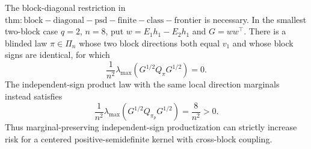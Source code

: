 The block-diagonal restriction in \(\mathrm{thm:block-diagonal-psd-finite-class-frontier}\) is necessary.  In the smallest two-block case \(q=2\), \(n=8\), put \(w=E_1h_1-E_2h_1\) and \(G=ww^\top\).  There is a blinded law \(\pi\in\Pi_n\) whose two block directions both equal \(v_1\) and whose block signs are identical, for which
\[
\frac1{n^2}\lambda_{\max}(G^{1/2}Q_\pi G^{1/2})=0.
\]
The independent-sign product law with the same local direction marginals instead satisfies
\[
\frac1{n^2}\lambda_{\max}(G^{1/2}Q_{\pi_p}G^{1/2})=\frac8{n^2}>0.
\]
Thus marginal-preserving independent-sign productization can strictly increase risk for a centered positive-semidefinite kernel with cross-block coupling.